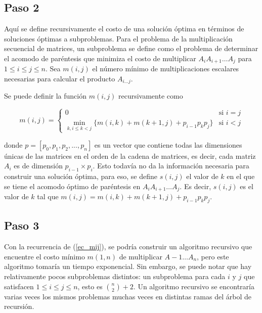 \documentclass{article}
\newcommand*{\comb}[2]{\binom #1#2}%
\begin{document}
\subsection*{Paso 2}

Aquí se define recursivamente el costo de una solución óptima en términos de soluciones óptimas a subproblemas. Para el problema de la multiplicación secuencial de matrices, un subproblema se define como el problema de determinar el acomodo de paréntesis que minimiza el costo de multiplicar $A_i A_{i + 1} \hdots A_j$ para $1 \leq i \leq j \leq n$. Sea $m(i, j)$ el número mínimo de multiplicaciones escalares necesarias para calcular el producto $A_{i \hdots j}$.

Se puede definir la función $m(i,j)$ recursivamente como

\begin{equation}
\label{ec_mij}
m(i,j) = \left\{
    \begin{array}{ll}
        0                                                               & \mbox{si } i = j \\
        \min_{k, i \le k < j} \{ m(i,k) + m(k+1,j) + p_{i-1} p_k p_j \} & \mbox{si } i < j
    \end{array}
\right.
\end{equation}

donde $p = \left[ p_0, p_1, p_2, ..., p_n \right]$ es un vector que contiene todas las dimensiones únicas de las matrices en el orden de la cadena de matrices, es decir, cada matriz $A_i$ es de dimensión $p_{i-1} \times p_i$. Esto todavía no da la información necesaria para construir una solución óptima, para eso, se define $s(i, j)$ el valor de $k$ en el que se tiene el acomodo óptimo de paréntesis en $A_i A_{i + 1} \hdots A_j$. Es decir, $s(i, j)$ es el valor de $k$ tal que $m(i, j) = m(i,k) + m(k+1,j) + p_{i-1} p_k p_j$.
 
\subsection*{Paso 3}

Con la recurrencia de (\ref{ec_mij}), se podría construir un algoritmo recursivo que encuentre el costo mínimo $m(1, n)$ de multiplicar $A-1 \hdots A_n$, pero este algoritmo tomaría un tiempo exponencial. Sin embargo, se puede notar que hay relativamente pocos subproblemas distintos: un subproblema para cada $i$  y $j$ que satisfacen $1 \leq i \leq j \leq n$, esto es $\comb{n}{2} + 2$. Un algoritmo recursivo se encontraría varias veces los mismos problemas muchas veces en distintas ramas del árbol de recursión.
\end{document}
